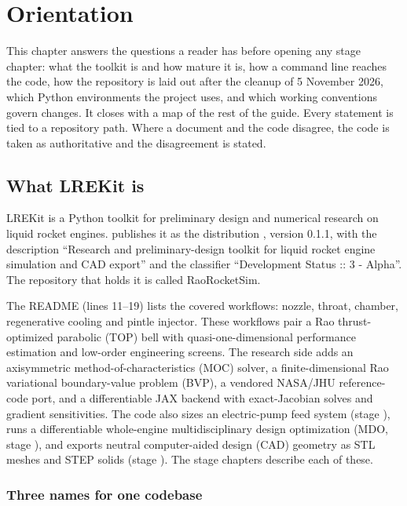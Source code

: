 \chapter{Orientation}\label{ch:orientation}

This chapter answers the questions a reader has before opening any stage chapter: what the toolkit is and how mature it is, how a command line reaches the code, how the repository is laid out after the cleanup of 5 November 2026, which Python environments the project uses, and which working conventions govern changes. It closes with a map of the rest of the guide. Every statement is tied to a repository path. Where a document and the code disagree, the code is taken as authoritative and the disagreement is stated.

\section{What LREKit is}\label{sec:orient-what}

LREKit is a Python toolkit for preliminary design and numerical research on liquid rocket engines.  publishes it as the distribution , version 0.1.1, with the description ``Research and preliminary-design toolkit for liquid rocket engine simulation and CAD export'' and the classifier ``Development Status :: 3 - Alpha''. The repository that holds it is called RaoRocketSim.

The README (lines 11--19) lists the covered workflows: nozzle, throat, chamber, regenerative cooling and pintle injector. These workflows pair a Rao thrust-optimized parabolic (TOP) bell with quasi-one-dimensional performance estimation and low-order engineering screens. The research side adds an axisymmetric method-of-characteristics (MOC) solver, a finite-dimensional Rao variational boundary-value problem (BVP), a vendored NASA/JHU reference-code port, and a differentiable JAX backend with exact-Jacobian solves and gradient sensitivities. The code also sizes an electric-pump feed system (stage ), runs a differentiable whole-engine multidisciplinary design optimization (MDO, stage ), and exports neutral computer-aided design (CAD) geometry as STL meshes and STEP solids (stage ). The stage chapters describe each of these.

\subsection{Three names for one codebase}

